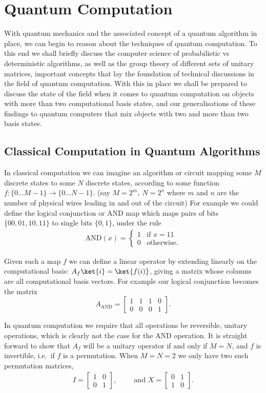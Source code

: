 \section{Quantum Computation}

With quantum mechanics and the associated concept of a quantum algorithm in place, we can begin to reason about the techniques of quantum computation. To this end we shall briefly discuss the computer science of probabilistic vs deterministic algorithms, as well as the group theory of different sets of unitary matrices, important concepts that lay the foundation of technical discussions in the field of quantum computation. With this in place we shall be prepared to discuss the state of the field when it comes to quantum computation on objects with more than two computational basis states, and our generalisations of these findings to quantum computers that mix objects with two and more than two basis states.

\subsection{Classical Computation in Quantum Algorithms}
In classical computation we can imagine an algorithm or circuit mapping some $M$ discrete states to some $N$ discrete states, according to some function $f: \{0\dots M-1\} \to \{0\dots N-1\}$. (say $M = 2^m,\ N = 2^n$ where $m$ and $n$ are the number of physical wires leading in and out of the circuit) For example we could define the logical conjunction or AND map which maps pairs of bits $\{00, 01, 10, 11\}$ to single bits $\{0, 1\}$, under the rule
\begin{align*}
	\text{AND}(x) = \begin{cases}
		1 & \text{if\ } x = 11\\
		0 & \text{otherwise.}
	\end{cases}
\end{align*}

Given such a map $f$ we can define a linear operator by extending linearly on the computational basis: $A_f\ket{i} = \ket{f(i)}$, giving a matrix whose columns are all computational basis vectors. For example our logical conjunction becomes the matrix
\[
A_\text{AND} = \left[\begin{matrix}
	1&1&1&0\\
	0&0&0&1
\end{matrix}\right].
\]

In quantum computation we require that all operations be reversible, unitary operations, which is clearly not the case for the AND operation. It is straight forward to show that $A_f$ will be a unitary operator if and only if $M=N$, and $f$ is invertible, i.e.\ if $f$ is a permutation. When $M = N = 2$ we only have two such permutation matrices,
\begin{align*}
	I = \left[\begin{matrix}
		1&0\\
		0&1
	\end{matrix}\right],
	&&&
	\text{and\ }X = \left[\begin{matrix}
		0&1\\
		1&0
	\end{matrix}\right].
\end{align*}

